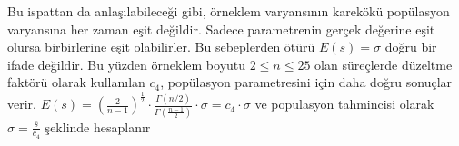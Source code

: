 Bu ispattan da anlaşılabileceği gibi, örneklem varyansının karekökü popülasyon varyansına her zaman eşit değildir. Sadece parametrenin gerçek değerine eşit olursa birbirlerine eşit olabilirler. Bu sebeplerden ötürü $E(s) = \sigma$ doğru bir ifade değildir. Bu yüzden örneklem boyutu $2\le n \le25$ olan süreçlerde düzeltme faktörü olarak kullanılan $c_4$, popülasyon parametresini için daha doğru sonuçlar verir. $E(s)=\left(\frac{2}{n-1}\right)^{\frac{1}{2}}\cdot \frac{\Gamma (n/2)}{\Gamma(\frac{n-1}{2})}\cdot \sigma =c_4\cdot \sigma$ ve populasyon tahmincisi olarak $\hat{\sigma }=\frac{\bar{s}}{c_4}$ şeklinde hesaplanır\\